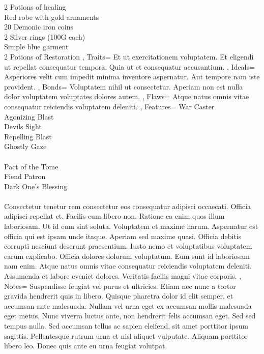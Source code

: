 \documentclass[10pt,a4paper]{scrbook}
\begin{document}
{{			2 Potions of healing \\
			Red robe with gold arnaments \\
			20 Demonic iron coins \\
			2 Silver rings (100G each) \\
			Simple blue garment \\
			2 Potions of Restoration 
		},
		Traits={
			Et ut exercitationem voluptatem. 
			Et eligendi ut repellat consequatur tempora. 
			Quia ut et consequatur accusantium.
		},
		Ideals={
			Asperiores velit cum impedit minima inventore aspernatur. 
			Aut tempore nam iste provident. 
		},
		Bonds={
			Voluptatem nihil ut consectetur. 
			Aperiam non est nulla dolor voluptatem voluptates dolores autem.
		},
		Flaws={
			Atque natus omnis vitae consequatur reiciendis voluptatem deleniti.
		},
		Features={
			War Caster \\
			Agonizing Blast \\
			Devils Sight \\
			Repelling Blast \\
			Ghostly Gaze \\
			\\
			Pact of the Tome \\
			Fiend Patron \\
			Dark One's Blessing \\
			\\
			Consectetur tenetur rem consectetur eos consequatur adipisci occaecati. 
			Officia adipisci repellat et. 
			Facilis cum libero non. 
			Ratione ea enim quos illum laboriosam.
			Ut id eum sint soluta. 
			Voluptatem et maxime harum. 
			Aspernatur est officia qui est ipsam unde itaque. 
			Aperiam sed maxime quasi. 
			Officia debitis corrupti nesciunt deserunt praesentium.
			Iusto nemo et voluptatibus voluptatem earum explicabo. 
			Officia dolores dolorum voluptatum. 
			Eum sunt id laboriosam nam enim. 
			Atque natus omnis vitae consequatur reiciendis voluptatem deleniti. 
			Assumenda et labore eveniet dolores. 
			Veritatis facilis magni vitae corporis.
		},
		Notes={
			Suspendisse feugiat vel purus et ultricies. 
			Etiam nec nunc a tortor gravida hendrerit quis in libero. 
			Quisque pharetra dolor id elit semper, 
			et accumsan ante malesuada. 
			Nullam vel urna eget ex accumsan mollis malesuada eget metus. 
			Nunc viverra luctus ante, non hendrerit felis accumsan eget.
			Sed sed tempus nulla. Sed accumsan tellus ac sapien eleifend, 
			sit amet porttitor ipsum sagittis. 
			Pellentesque rutrum urna et nisl aliquet vulputate. 
			Aliquam porttitor libero leo.
			Donec quis ante eu urna feugiat volutpat. 
		}
	}
\end{document}

